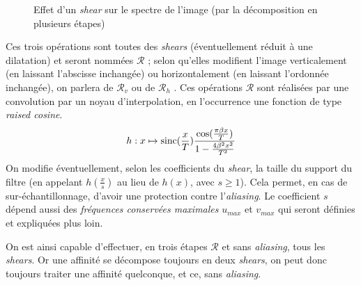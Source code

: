 \begin{figure}
		\caption{Effet d'un \emph{shear} sur le spectre de l'image (par la décomposition en plusieurs étapes)}
		\label{szeliski_decompoSzeliski}
	\end{figure}
	
	Ces trois opérations sont toutes des \emph{shears} (éventuellement réduit à une dilatation) et seront nommées $\mathcal R$ ; selon qu'elles modifient l'image verticalement (en laissant l'abscisse inchangée) ou horizontalement (en laissant l'ordonnée inchangée), on parlera de $\mathcal R_v$ ou de $\mathcal R_h$ . Ces opérations $\mathcal R$ sont réalisées par une convolution par un noyau d'interpolation, en l'occurrence une fonction de type \emph{raised cosine}.
	\[h : x \mapsto \operatorname{sinc}(\frac{x}{T})\frac{\cos(\frac{\pi\beta x}{T})}{1-\frac{4\beta^2x^2}{T^2}}\]
	On modifie éventuellement, selon les coefficients du \emph{shear}, la taille du support du filtre (en appelant $h(\frac{x}{s})$ au lieu de $h(x)$, avec $s\geq 1$). Cela permet, en cas de sur-échantillonnage, d'avoir une protection contre l'\emph{aliasing}. Le coefficient $s$ dépend aussi des \emph{fréquences conservées maximales} $u_{max}$ et $v_{max}$ qui seront définies et expliquées plus loin.
	
	On est ainsi capable d'effectuer, en trois étapes $\mathcal R$ et sans \emph{aliasing}, tous les \emph{shears}. Or une affinité se décompose toujours en deux \emph{shears}, on peut donc toujours traiter une affinité quelconque, et ce, sans \emph{aliasing}.
	
